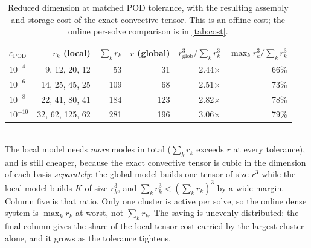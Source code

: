 \begin{table}[tb]
  \centering
  \caption{Reduced dimension at matched POD tolerance, with the resulting assembly and storage cost of the exact convective tensor. This is an offline cost; the online per-solve comparison is in \cref{tab:cost}.}
  \label{tab:dim_comparison}
  \begin{tabular}{lrrrrr}
    \toprule
    $\varepsilon_{\mathrm{POD}}$ & $r_k$ (local) & $\sum_k r_k$ & $r$ (global) & $r_{\mathrm{glob}}^3/\sum_k r_k^3$ & $\max_k r_k^3/\sum_k r_k^3$ \\
    \midrule
    $10^{-4}$ & 9, 12, 20, 12 & 53 & 31 & 2.44$\times$ & 66\% \\
    $10^{-6}$ & 14, 25, 45, 25 & 109 & 68 & 2.51$\times$ & 73\% \\
    $10^{-8}$ & 22, 41, 80, 41 & 184 & 123 & 2.82$\times$ & 78\% \\
    $10^{-10}$ & 32, 62, 125, 62 & 281 & 196 & 3.06$\times$ & 79\% \\
    \bottomrule
  \end{tabular}
  \\[2pt] \footnotesize The local model needs \emph{more} modes in total ($\sum_k r_k$ exceeds $r$ at every tolerance), and is still cheaper, because the exact convective tensor is cubic in the dimension of each basis \emph{separately}: the global model builds one tensor of size $r^3$ while the local model builds $K$ of size $r_k^3$, and $\sum_k r_k^3 < (\sum_k r_k)^3$ by a wide margin. Column five is that ratio. Only one cluster is active per solve, so the online dense system is $\max_k r_k$ at worst, not $\sum_k r_k$. The saving is unevenly distributed: the final column gives the share of the local tensor cost carried by the largest cluster alone, and it grows as the tolerance tightens.
\end{table}
